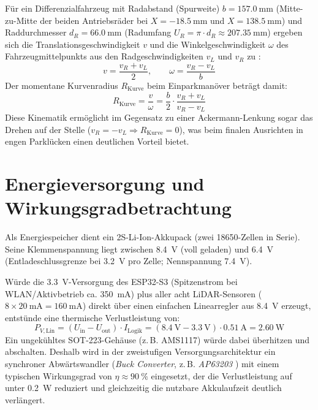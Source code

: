 Für ein Differenzialfahrzeug mit Radabstand (Spurweite) $b = \qty{157,0}{\milli\meter}$ (Mitte-zu-Mitte der beiden Antriebsräder bei $X = \qty{-18,5}{\milli\meter}$ und $X = \qty{138,5}{\milli\meter}$) und Raddurchmesser $d_R = \qty{66,0}{\milli\meter}$ (Radumfang $U_R = \pi \cdot d_R \approx \qty{207,35}{\milli\meter}$) ergeben sich die Translationsgeschwindigkeit $v$ und die Winkelgeschwindigkeit $\omega$ des Fahrzeugmittelpunkts aus den Radgeschwindigkeiten $v_L$ und $v_R$ zu \cite{SiegwartRobotik}:
\begin{equation}
  v = \frac{v_R + v_L}{2}, \qquad \omega = \frac{v_R - v_L}{b}
  \label{eq:diff_kinematik}
\end{equation}
Der momentane Kurvenradius $R_{\mathrm{Kurve}}$ beim Einparkmanöver beträgt damit:
\begin{equation}
  R_{\mathrm{Kurve}} = \frac{v}{\omega} = \frac{b}{2} \cdot \frac{v_R + v_L}{v_R - v_L}
  \label{eq:kurvenradius}
\end{equation}
Diese Kinematik ermöglicht im Gegensatz zu einer Ackermann-Lenkung sogar das Drehen auf der Stelle ($v_R = -v_L \Rightarrow R_{\mathrm{Kurve}} = 0$), was beim finalen Ausrichten in engen Parklücken einen deutlichen Vorteil bietet.

\section{Energieversorgung und Wirkungsgradbetrachtung}
\label{sec:energie_grundlagen}
Als Energiespeicher dient ein 2S-Li-Ion-Akkupack (zwei 18650-Zellen in Serie). Seine Klemmenspannung liegt zwischen \qty{8,4}{\volt} (voll geladen) und \qty{6,4}{\volt} (Entladeschlussgrenze bei \qty{3,2}{\volt} pro Zelle; Nennspannung \qty{7,4}{\volt}).

Würde die \qty{3,3}{\volt}-Versorgung des ESP32-S3 (Spitzenstrom bei WLAN/Aktivbetrieb ca. \qty{350}{\milli\ampere}) plus aller acht LiDAR-Sensoren ($8 \times \qty{20}{\milli\ampere} = \qty{160}{\milli\ampere}$) direkt über einen einfachen Linearregler aus \qty{8,4}{\volt} erzeugt, entstünde eine thermische Verlustleistung von:
\begin{equation}
  P_{V,\mathrm{Lin}} = (U_{\mathrm{in}} - U_{\mathrm{out}}) \cdot I_{\mathrm{Logik}} = (\qty{8,4}{\volt} - \qty{3,3}{\volt}) \cdot \qty{0,51}{\ampere} = \qty{2,60}{\watt}
  \label{eq:verlust_lin}
\end{equation}
Ein ungekühltes SOT-223-Gehäuse (z.\,B. AMS1117) würde dabei überhitzen und abschalten. Deshalb wird in der zweistufigen Versorgungsarchitektur ein synchroner Abwärtswandler (\emph{Buck Converter}, z.\,B. \emph{AP63203} \cite{Diodes_AP63203}) mit einem typischen Wirkungsgrad von $\eta \approx \qty{90}{\percent}$ eingesetzt, der die Verlustleistung auf unter \qty{0,2}{\watt} reduziert und gleichzeitig die nutzbare Akkulaufzeit deutlich verlängert.
